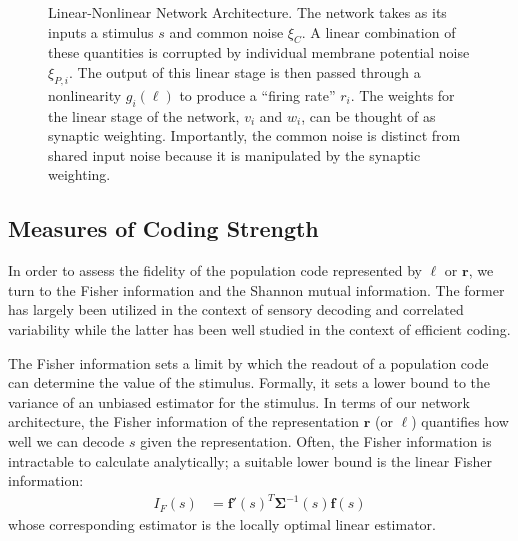 \documentclass[12pt]{article}
\begin{document}
\begin{figure}[ht]
{}
	
	\caption{Linear-Nonlinear Network Architecture. The network takes as its inputs a stimulus $s$ and common noise $\xi_C$. A linear combination of these quantities is corrupted by individual membrane potential noise $\xi_{P,i}$. The output of this linear stage is then passed through a nonlinearity $g_i(\ell)$ to produce a ``firing rate'' $r_i$. The weights for the linear stage of the network, $v_i$ and $w_i$, can be thought of as synaptic weighting. Importantly, the common noise is distinct from  shared input noise because it is manipulated by the synaptic weighting.}
	\label{architecture}
\end{figure}

\subsection{Measures of Coding Strength}
In order to assess the fidelity of the population code represented by $\boldsymbol{\ell}$ or $\mathbf{r}$, we turn to the Fisher information and the Shannon mutual information. The former has largely been utilized in the context of sensory decoding and correlated variability \citep{abbott1999} while the latter has been well studied in the context of efficient coding. 

The Fisher information sets a limit by which the readout of a population code can determine the value of the stimulus. Formally, it sets a lower bound to the variance of an unbiased estimator for the stimulus. In terms of our network architecture, the Fisher information of the representation $\mathbf{r}$ (or $\boldsymbol{\ell}$) quantifies how well we can decode $s$ given the representation. Often, the Fisher information is intractable to calculate analytically; a suitable lower bound is the linear Fisher information:
\begin{align}
I_F(s) &= \mathbf{f}'(s)^T \boldsymbol{\Sigma}^{-1}(s) \mathbf{f}(s)
\end{align}
whose corresponding estimator is the locally optimal linear estimator. 
\end{document}
